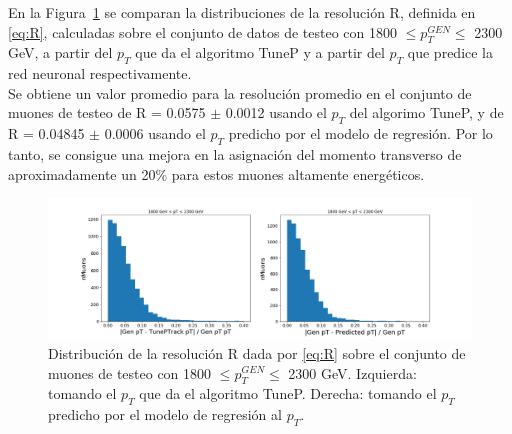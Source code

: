 En la Figura~\ref{fig:R_predicted} se comparan la distribuciones de la resoluci\'on R, definida en \eqref{eq:R}, calculadas sobre el conjunto de datos de testeo con 1800 $\leq p_{T}^{GEN} \leq$ 2300 GeV, a partir del $p_{T}$ que da el algoritmo TuneP y a partir del $p_{T}$ que predice la red neuronal respectivamente. \\
Se obtiene un valor promedio para la resoluci\'on promedio en el conjunto de muones de testeo de R = 0.0575 $\pm$ 0.0012 usando el $p_{T}$ del algorimo TuneP, y de R = 0.04845 $\pm$ 0.0006 usando el $p_{T}$ predicho por el modelo de regresi\'on. Por lo tanto, se consigue una mejora en la asignaci\'on del momento transverso de aproximadamente un 20\% para estos muones altamente energ\'eticos.

\begin{figure}[h]
\centering
\includegraphics[width=1.2\textwidth]{figures/R_predicted_1800_2300.png}
\caption{Distribuci\'on de la resoluci\'on R dada por \eqref{eq:R} sobre el conjunto de muones de testeo con 1800 $\leq p_{T}^{GEN} \leq$ 2300 GeV. Izquierda: tomando el $p_{T}$ que da el algoritmo TuneP. Derecha: tomando el $p_{T}$ predicho por el modelo de regresi\'on al $p_{T}$.}
\label{fig:R_predicted}        
\end{figure}



\clearpage
